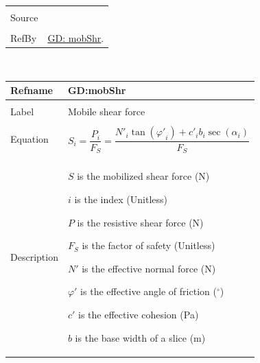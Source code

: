 \documentclass[12pt]{article}
\begin{document}
\begin{minipage}{\textwidth}
\begin{tabular}{p{} p{}}
                                         \\ \midrule \\
                                         Source & \cite{chen2005}
                                                  \\ \midrule \\
                                                  RefBy & \hyperref[GD:mobShr]{GD: mobShr}.
\\ \bottomrule \end{tabular}
\end{minipage}
\par~

\noindent \begin{minipage}{\textwidth}
\begin{tabular}{p{} p{}}
\toprule \textbf{Refname} & \textbf{GD:mobShr}
\label{GD:mobShr}
\\ \midrule \\
Label & Mobile shear force
        \\ \midrule \\
        Equation & \begin{displaymath}
                   S_{i}=\frac{P_{i}}{{F_{S}}}=\frac{{N'}_{i} \tan\left({φ'}_{i}\right)+{c'}_{i} b_{i} \sec\left(α_{i}\right)}{{F_{S}}}
                   \end{displaymath}
                   \\ \midrule \\
                   Description & \begin{symbDescription}
                                 \item{$S$ is the mobilized shear force (N)}
                                 \item{$i$ is the index (Unitless)}
                                 \item{$P$ is the resistive shear force (N)}
                                 \item{${F_{S}}$ is the factor of safety (Unitless)}
                                 \item{$N'$ is the effective normal force (N)}
                                 \item{$φ'$ is the effective angle of friction (${}^{\circ}$)}
                                 \item{$c'$ is the effective cohesion (Pa)}
                                 \item{$b$ is the base width of a slice (m)}

\end{symbDescription}
\end{tabular}
\end{minipage}
\end{document}

